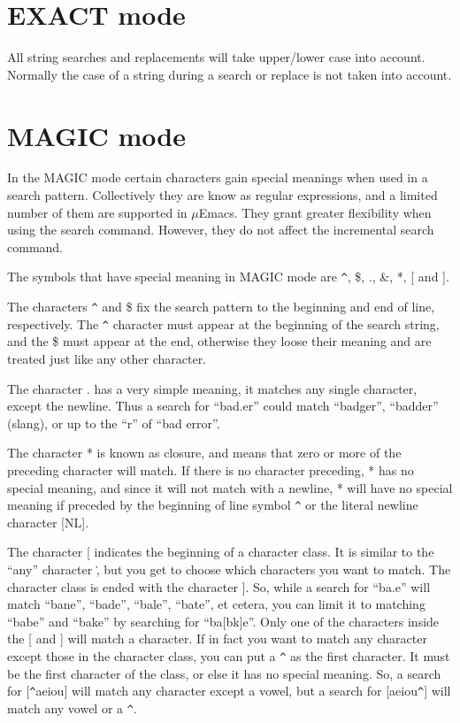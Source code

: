 \section{EXACT mode}

All string searches and replacements will take upper/lower case into
account. Normally the case of a string during a search or replace is
not taken into account.

\section{MAGIC mode}

In the MAGIC mode certain characters gain special meanings when used in
a search pattern. Collectively they are know as regular expressions,
and a limited number of them are supported in $\mu$Emacs. They grant
greater flexibility when using the search command. However, they do not
affect the incremental search command.

The symbols that have special meaning in MAGIC mode are  \verb+^+, \$, .,
\&, *, [ and ].

The characters \verb+^+ and \$ fix the search pattern to the beginning
and end of line, respectively. The \verb+^+ character must appear at the
beginning of the search string, and the \$ must appear at the end,
otherwise they loose their meaning and are treated just like any other
character.

The character . has a very simple meaning, it matches any single
character, except the newline. Thus a search for ``bad.er'' could match
``badger'', ``badder'' (slang), or up to the ``r'' of ``bad error''.

The character * is known as closure, and means that zero or more of the
preceding character will match. If there is no character preceding, *
has no special meaning, and since it will not match with a newline, *
will have no special meaning if preceded by the beginning of line
symbol \verb+^+ or the literal newline character [NL].

The character [ indicates the beginning of a character class. It is
similar to the ``any'' character \., but you get to choose which
characters you want to match. The character class is ended with the
character ]. So, while a search for ``ba.e'' will match ``bane'',
``bade'', ``bale'', ``bate'', et cetera, you can limit it to matching
``babe'' and ``bake'' by searching for ``ba[bk]e''. Only one of the
characters inside the [ and ] will match a character. If in fact you
want to match any character except those in the character class, you
can put a \verb+^+ as the first character. It must be the first
character of the class, or else it has no special meaning. So, a search
for [\verb+^+aeiou] will match any character except a vowel, but a
search for [aeiou\verb+^+] will match any vowel or a \verb+^+.

